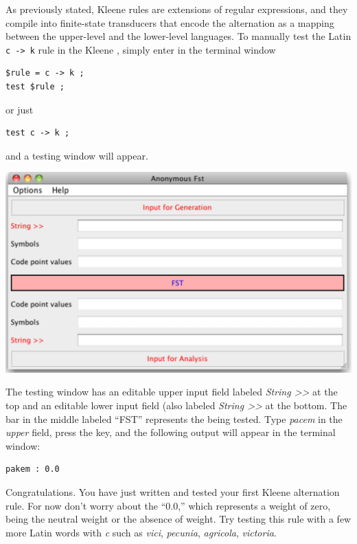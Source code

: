 As previously stated, Kleene rules are extensions of 
regular expressions, and they compile into finite-state
transducers that encode the alternation as a mapping between the
upper-level and the lower-level languages.  To manually test the Latin \texttt{c -> k} rule in the Kleene , simply
enter in the terminal window

\begin{Verbatim}
$rule = c -> k ;
test $rule ;
\end{Verbatim}

\noindent
or just


\begin{Verbatim}
test c -> k ;
\end{Verbatim}


\noindent
and a testing window will appear.

\vspace{0.3cm}

\begin{center}
\includegraphics[width=\textwidth]{images/testWindow.pdf}
\end{center}

The testing window has an editable upper input field labeled
\emph{String >>} at the top and an editable lower input field (also
labeled \emph{String >>} at the bottom.  The
bar in the middle labeled ``FST'' represents the \fst{} being tested.  Type \emph{pacem} in the \emph{upper} field,
press the  key, and the following output will appear in the  terminal window:


\begin{Verbatim}
pakem : 0.0
\end{Verbatim}

\noindent
Congratulations.  You have just written
and tested your first Kleene alternation rule.  For now don't worry about the ``0.0,'' which
represents a weight of zero, being the neutral weight
or the absence of weight.    Try testing this rule with a few more Latin words with \emph{c} such as
\emph{vici}, \emph{pecunia},
\emph{agricola}, \emph{victoria}.


